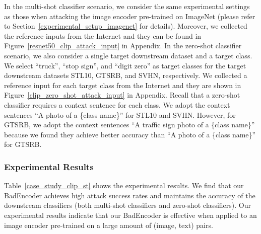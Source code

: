 In the multi-shot classifier scenario, we consider  the same experimental settings as  those when attacking the image encoder pre-trained on ImageNet (please refer to Section~\ref{experimental_setup_imagenet} for details). 
Moreover, we collected the reference inputs  from the Internet and they can be found in Figure~\ref{resnet50_clip_attack_input} in Appendix. 
In the zero-shot classifier scenario, we also consider a single target downstream dataset and a target class. We select ``truck'', ``stop sign'', and ``digit zero'' as target classes for the target downstream datasets STL10, GTSRB, and SVHN, respectively. We collected a reference input for each target class from the Internet and they are shown in Figure~\ref{clip_zero_shot_attack_input} in Appendix. Recall that a zero-shot classifier requires a context sentence for each class. We adopt the context sentences ``A photo of a \{class name\}'' for STL10 and SVHN. However, for GTSRB, we adopt the context sentences ``A traffic sign photo of a \{class name\}'' because we found they achieve better accuracy than ``A photo of a \{class name\}'' for GTSRB.  







\subsubsection{Experimental Results} Table~\ref{case_study_clip_st} shows the experimental results. We find that our BadEncoder achieves high attack success rates and maintains the  accuracy of the downstream classifiers (both multi-shot classifiers and zero-shot classifiers). Our experimental results indicate that our BadEncoder is effective when applied to an image encoder pre-trained on a large amount of (image, text) pairs. 


